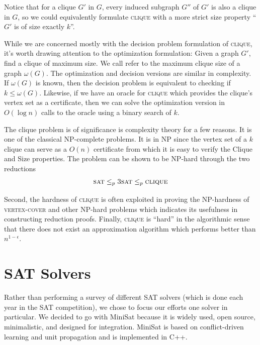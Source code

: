 \documentclass[]{article}
\newcommand{\clique}{\textsc{clique}}
\begin{document}
	Notice that for a clique $G'$ in $G$, every induced subgraph $G''$ of $G'$ is also a clique in $G$, so we could equivalently formulate \clique{} with a more strict size property ``$G'$ is of size exactly $k$''.
	
	While we are concerned mostly with the decision problem formulation of \clique{}, it's worth drawing attention to the optimization formulation: Given a graph $G'$, find a clique of maximum size. We call refer to the maximum clique size of a graph $\omega(G)$. The optimization and decision versions are similar in complexity. If $\omega(G)$ is known, then the decision problem is equivalent to checking if $k \le \omega(G)$. Likewise, if we have an oracle for \clique{} which provides the clique's vertex set as a certificate, then we can solve the optimization version in $O(\log n)$ calls to the oracle using a binary search of $k$.
	
	The clique problem is of significance is complexity theory for a few reasons. It is one of the classical NP-complete problems. It is in NP since the vertex set of a $k$ clique can serve as a $O(n)$ certificate from which it is easy to verify the Clique and Size properties. The problem can be shown to be NP-hard through the two reductions
	\begin{align}
	\textsc{sat} \le_p \textsc{3sat} \le_p \clique
	\end{align}
	
	Second, the hardness of \clique{} is often exploited in proving the NP-hardness of \textsc{vertex-cover} and other NP-hard problems which indicates its usefulness in constructing reduction proofs. Finally, \clique{} is ``hard'' in the algorithmic sense that there does not exist an approximation algorithm which performs better than $n^{1 - \epsilon}$\cite{Hastad1999}.
	
	\section{SAT Solvers}
	Rather than performing a survey of different SAT solvers (which is done each year in the SAT competition), we chose to focus our efforts one solver in particular. We decided to go with MiniSat because it is widely used, open source, minimalistic, and designed for integration. MiniSat is based on conflict-driven learning and unit propagation and is implemented in C++.\cite{Een03anextensible}
	
	
\end{document}
